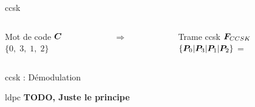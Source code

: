 \documentclass[../main.tex]{subfiles}
\begin{document}
\begin{frame}{\acrfull{ccsk}}
  \begin{overlayarea}{\linewidth}{.2 \textheight}
    \begin{columns}
      \begin{column}{.3\linewidth} \centering
        Mot de code $\bm{C}$\\$\{ 0, \; 3, \; 1,\; 2\}$
      \end{column}
      \begin{column}{.1\linewidth} \centering
        $\Rightarrow$
      \end{column}
      \begin{column}{.55\linewidth} \centering
        Trame \acrshort{ccsk} $\bm{F}_{CCSK}$\\$\{ \bm{P}_{0} | \bm{P}_{3} | \bm{P}_{1} | \bm{P}_{2} \}$ = \Ob{}\Xb{}\Xb{}\Xb{}~~\Xb{}\Xb{}\Xb{}\Ob{}~~\Xb{}\Ob{}\Xb{}\Xb{}~~\Xb{}\Xb{}\Ob{}\Xb{}
      \end{column}
    \end{columns}

  \end{overlayarea}
\end{frame}


\begin{frame}{\acrshort{ccsk} : Démodulation}
  
\end{frame}

\begin{frame}{\acrfull{ldpc}}
  \textbf{TODO, Juste le principe}
\end{frame}
\end{document}
